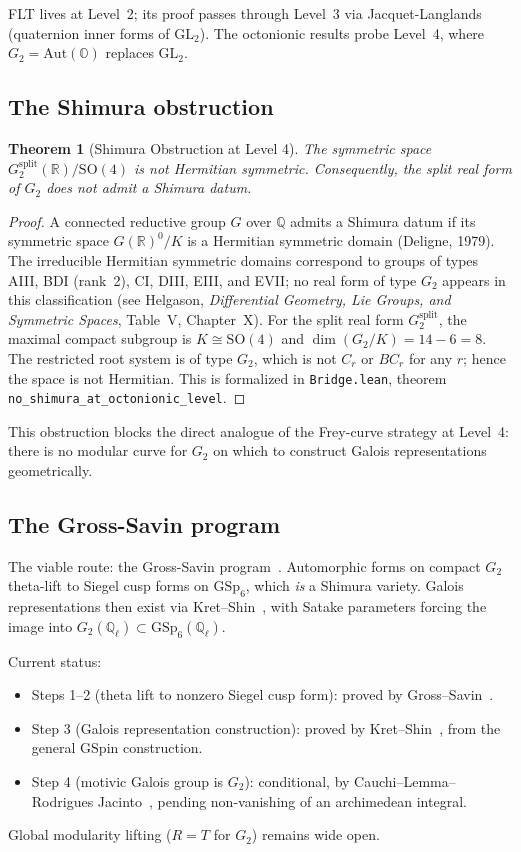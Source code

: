 \documentclass[11pt]{amsart}
\theoremstyle{plain}
\newtheorem{theorem}{Theorem}[section]
\theoremstyle{definition}
\theoremstyle{remark}
\newcommand{\Q}{\mathbb{Q}}
\newcommand{\R}{\mathbb{R}}
\newcommand{\OO}{\mathbb{O}}
\newcommand{\Aut}{\mathrm{Aut}}
\newcommand{\GL}{\mathrm{GL}}
\newcommand{\GSp}{\mathrm{GSp}}
\newcommand{\SO}{\mathrm{SO}}
\begin{document}
FLT lives at Level~2; its proof passes through Level~3 via Jacquet-Langlands
(quaternion inner forms of $\GL_2$).
The octonionic results probe Level~4, where $G_2 = \Aut(\OO)$ replaces $\GL_2$.

\subsection{The Shimura obstruction}

\begin{theorem}[Shimura Obstruction at Level 4]\label{thm:shimura}
The symmetric space $G_2^{\mathrm{split}}(\R) / \SO(4)$ is not Hermitian symmetric.
Consequently, the split real form of $G_2$ does not admit a Shimura datum.
\end{theorem}

\begin{proof}
A connected reductive group $G$ over $\Q$ admits a Shimura datum
if its symmetric space $G(\R)^0 / K$ is a Hermitian symmetric domain
(Deligne, 1979).
The irreducible Hermitian symmetric domains correspond to groups of types
AIII, BDI (rank~2), CI, DIII, EIII, and EVII; no real form of type $G_2$ appears
in this classification (see Helgason, \emph{Differential Geometry, Lie Groups,
and Symmetric Spaces}, Table~V, Chapter~X).
For the split real form $G_2^{\mathrm{split}}$, the maximal compact subgroup is
$K \cong \SO(4)$ and $\dim(G_2/K) = 14 - 6 = 8$.
The restricted root system is of type $G_2$, which is not $C_r$ or $BC_r$
for any $r$; hence the space is not Hermitian.
This is formalized in \texttt{Bridge.lean}, theorem \texttt{no\_shimura\_at\_octonionic\_level}.
\end{proof}

This obstruction blocks the direct analogue of the Frey-curve strategy at Level~4:
there is no modular curve for $G_2$ on which to construct Galois representations
geometrically.

\subsection{The Gross-Savin program}

The viable route: the Gross-Savin program~\cite{GrossSavin1998}.
Automorphic forms on compact $G_2$ theta-lift to Siegel cusp forms on $\GSp_6$,
which \emph{is} a Shimura variety.
Galois representations then exist via Kret--Shin~\cite{KretShin2023},
with Satake parameters forcing the image into $G_2(\Q_\ell) \subset \GSp_6(\Q_\ell)$.

Current status:
\begin{itemize}
  \item Steps 1--2 (theta lift to nonzero Siegel cusp form): proved by
    Gross--Savin~\cite{GrossSavin1998}.
  \item Step 3 (Galois representation construction): proved by
    Kret--Shin~\cite{KretShin2023}, from the general $\mathrm{GSpin}$ construction.
  \item Step 4 (motivic Galois group is $G_2$): conditional, by
    Cauchi--Lemma--Rodrigues Jacinto~\cite{CLRJ2025},
    pending non-vanishing of an archimedean integral.
\end{itemize}
Global modularity lifting ($R = T$ for $G_2$) remains wide open.
\end{document}
